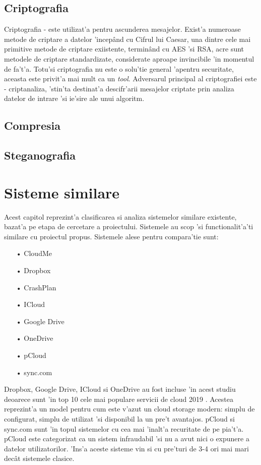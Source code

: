 \documentclass[12pt,a4paper,twoside]{report}
\begin{document}
\subsection{Criptografia}
Criptografia - este utilizat'a pentru ascunderea mesajelor. Exist'a numeroase metode de criptare a datelor 'incepând cu Cifrul lui Caesar, una dintre cele mai primitive metode de criptare exiistente, terminând cu AES 'si RSA, acre sunt metodele de criptare standardizate, considerate aproape invincibile 'in momentul de fa't'a. Totu'si criptografia nu este o solu'tie general 'apentru securitate, aceasta este privit'a mai mult ca un \textit{tool}. Adversarul principal al criptografiei este - criptanaliza, 'stin'ta destinat'a descifr'arii mesajelor criptate prin analiza datelor de intrare 'si ie'sire ale unui algoritm.


\subsection{Compresia}

\subsection{Steganografia}

\section{Sisteme similare}
Acest capitol reprezint'a clasificarea si analiza sistemelor similare existente, bazat'a pe etapa de cercetare a proiectului. Sistemele au scop 'si functionalit'a'ti similare cu proiectul propus. Sistemele alese pentru compara'tie sunt:
\begin{itemize}
\item[•] CloudMe
\item[•] Dropbox
\item[•] CrashPlan
\item[•] ICloud
\item[•] Google Drive
\item[•] OneDrive
\item[•] pCloud
\item[•] sync.com
\end{itemize}
Dropbox, Google Drive, ICloud si OneDrive au fost incluse 'in acest studiu deoarece sunt 'in top 10 cele mai populare servicii de cloud 2019 \cite{topcloud}. Acestea reprezint'a un model pentru cum este v'azut un cloud storage modern: simplu de configurat, simplu de utilizat 'si disponibil la un pre't avantajos.
pCloud si sync.com sunt 'in topul sistemelor cu cea mai 'inalt'a recuritate de pe pia't'a. pCloud este categorizat ca un sistem infraudabil 'si nu a avut nici o expunere a datelor utilizatorilor. 'Ins'a aceste sisteme vin si cu pre'turi de 3-4 ori mai mari decât sistemele clasice.
\end{document}
